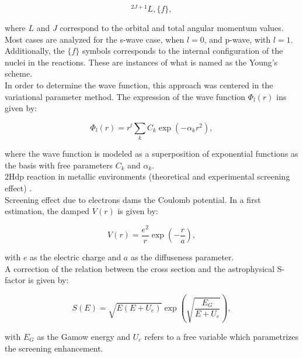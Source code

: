 \documentclass[openany]{book}
\begin{document}
\begin{equation}\label{eq:potential_Young_scheme}
	{}^{2J + 1} L, \{f\},
\end{equation}

where $L$ and $J$ correspond to the orbital and total angular momentum values. Most cases are analyzed for the s-wave case, when $l = 0$, and p-wave, with $l = 1$. Additionally, the $\{f\}$ symbols corresponds to the internal configuration of the nuclei in the reactions. These are instances of what is named as the Young's scheme.\\

In order to determine the wave function, this approach was centered in the variational parameter method. The expression of the wave function $\Phi_l(r)$ ins given by:

\begin{equation}\label{eq:potential_variational}
	\Phi_l(r) = r^l \sum_{k} C_k \exp(-\alpha_k r^2),
\end{equation}

where the wave function is modeled as a superposition of exponential functions as the basis with free parameters $C_k$ and $\alpha_k$. \\

2Hdp reaction in metallic environments (theoretical and experimental screening effect)  \cite{czerski_huke_heide_ruprecht_2006}. \\

Screening effect due to electrons dams the Coulomb potential. In a first estimation, the damped $V(r)$ is given by:

\begin{equation}\label{eq:potential_screening_simple}
	V(r) = \frac{e^2}{r} \exp {\left( - \frac{r}{a}\right)},
\end{equation}

with $e$ as the electric charge and $a$ as the diffuseness parameter. \\

A correction of the relation between the cross section and the astrophysical S-factor is given by:

\begin{equation}\label{eq:potential_screening_sFactor}
	S(E) = \sqrt{E(E+U_e)} \exp {\left( \sqrt{\frac{E_G}{E + U_e}}\right)},
\end{equation}

with $E_G$ as the Gamow energy and $U_e$ refers to a free variable which parametrizes the screening enhancement. \\
\end{document}
